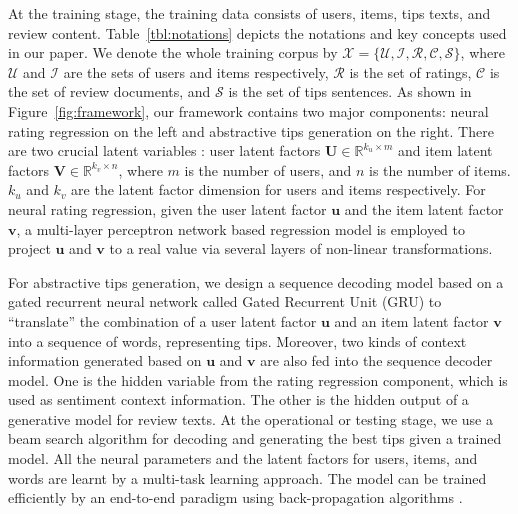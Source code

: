 \documentclass[sigconf]{acmart}
\begin{document}
At the training stage, the training data consists of users, items, tips texts, and review content.
Table~\ref{tbl:notations} depicts the notations and key concepts used in our paper.
We denote the whole training corpus by  $\mathcal{X} = \{\mathcal{U}, \mathcal{I}, \mathcal{R}, \mathcal{C}, \mathcal{S} \}$, where $\mathcal{U}$ and $\mathcal{I}$ are the sets of users and items respectively, $\mathcal{R}$ is the set of ratings, $\mathcal{C}$ is the set of review documents, and $\mathcal{S}$ is the set of tips sentences.
As shown in Figure~\ref{fig:framework}, our framework contains two major components: neural rating regression on the left and abstractive tips generation on the right.
There are two crucial latent variables
: user latent factors $\mathbf{U} \in \mathbb{R}^{k_u \times m}$ and item latent factors $\mathbf{V} \in \mathbb{R}^{k_v \times n}$, where $m$ is the number of users, and $n$ is the number of items. $k_u$ and $k_v$ are the latent factor dimension for users and items respectively.
For neural rating regression, given the user latent factor $\mathbf{u}$ and the item latent factor $\mathbf{v}$,  a multi-layer perceptron network based regression model is employed to project $\mathbf{u}$ and $\mathbf{v}$ to a real value via several layers of non-linear transformations.

For abstractive tips generation, we design a sequence decoding model based on a gated recurrent neural network called Gated Recurrent Unit (GRU) \cite{cho2014learning} to ``translate'' the combination of a user latent factor $\mathbf{u}$ and an item latent factor  $\mathbf{v}$ into a sequence of words, representing tips.
Moreover, two kinds of context information generated based on $\mathbf{u}$ and $\mathbf{v}$ are also fed into the sequence decoder model.
One is the hidden variable from the rating regression component, which is used as sentiment context information.
The other is the hidden output of a generative model for review texts.
At the operational or testing stage, we use a beam search algorithm \cite{koehn2004pharaoh} for decoding and generating the best tips given a trained model.
All the neural parameters and the latent factors for users, items, and words are  learnt by a multi-task learning approach.
The model can be trained efficiently by an end-to-end paradigm using back-propagation algorithms \cite{rumelhart1988learning}.
\end{document}
